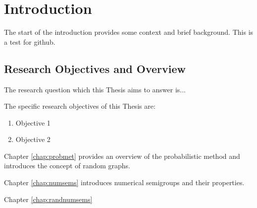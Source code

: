 \chapter{Introduction}\label{chap:intro}

The start of the introduction provides some context and brief background.
This is a test for github.
\section{Research Objectives and Overview}


The research question which this Thesis aims to answer is...


The specific research objectives of this Thesis are:

\begin{enumerate}
\item Objective 1
\item Objective 2
\end{enumerate}

Chapter \ref{chap:probmet} provides an overview of the probabilistic method and introduces the concept of random graphs. \par
Chapter \ref{chap:numsems} introduces numerical semigroups and their properties. \par
Chapter \ref{chap:randnumsems}
